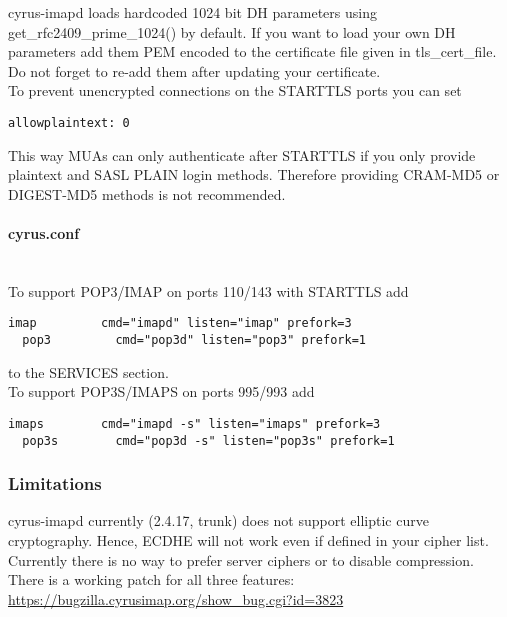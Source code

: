 cyrus-imapd loads hardcoded 1024 bit DH parameters using get\_rfc2409\_prime\_1024() by default. If you want to load your own DH parameters add them PEM encoded to the certificate file given in tls\_cert\_file. Do not forget to re-add them after updating your certificate.\\

To prevent unencrypted connections on the STARTTLS ports you can set
\begin{lstlisting}[breaklines]
  allowplaintext: 0
\end{lstlisting}
This way MUAs can only authenticate after STARTTLS if you only provide plaintext and SASL PLAIN login methods. Therefore providing CRAM-MD5 or DIGEST-MD5 methods is not recommended.\\

\paragraph*{cyrus.conf}\mbox{}\\

To support POP3/IMAP on ports 110/143 with STARTTLS add
\begin{lstlisting}[breaklines]
  imap         cmd="imapd" listen="imap" prefork=3
  pop3         cmd="pop3d" listen="pop3" prefork=1
\end{lstlisting}
to the SERVICES section.\\

To support POP3S/IMAPS on ports 995/993 add
\begin{lstlisting}[breaklines]
  imaps        cmd="imapd -s" listen="imaps" prefork=3
  pop3s        cmd="pop3d -s" listen="pop3s" prefork=1
\end{lstlisting}


\subsubsection{Limitations}

cyrus-imapd currently (2.4.17, trunk) does not support elliptic curve cryptography. Hence, ECDHE will not work even if defined in your cipher list.\\

Currently there is no way to prefer server ciphers or to disable compression.\\

There is a working patch for all three features:
\url{https://bugzilla.cyrusimap.org/show_bug.cgi?id=3823}\\

